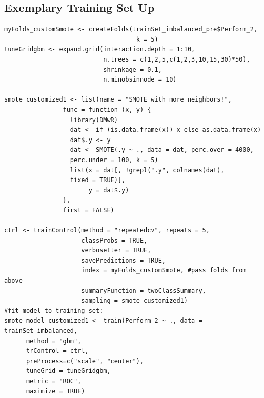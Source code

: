 \documentclass[12pt,a4paper]{article}
\begin{document}
\begin{appendices}
\section{Exemplary Training Set Up}\label{app:training_set_up}
\begin{verbatim}
myFolds_customSmote <- createFolds(trainSet_imbalanced_pre$Perform_2, 
                                    k = 5)
tuneGridgbm <- expand.grid(interaction.depth = 1:10, 
                           n.trees = c(1,2,5,c(1,2,3,10,15,30)*50),
                           shrinkage = 0.1,
                           n.minobsinnode = 10)

smote_customized1 <- list(name = "SMOTE with more neighbors!",
                func = function (x, y) {
                  library(DMwR)
                  dat <- if (is.data.frame(x)) x else as.data.frame(x)
                  dat$.y <- y
                  dat <- SMOTE(.y ~ ., data = dat, perc.over = 4000, 
                  perc.under = 100, k = 5)
                  list(x = dat[, !grepl(".y", colnames(dat), 
                  fixed = TRUE)], 
                       y = dat$.y)
                },
                first = FALSE) 

ctrl <- trainControl(method = "repeatedcv", repeats = 5,
                     classProbs = TRUE,
                     verboseIter = TRUE,
                     savePredictions = TRUE,
                     index = myFolds_customSmote, #pass folds from above 
                     summaryFunction = twoClassSummary,
                     sampling = smote_customized1) 
#fit model to training set:
smote_model_customized1 <- train(Perform_2 ~ ., data = trainSet_imbalanced, 
      method = "gbm",
      trControl = ctrl,
      preProcess=c("scale", "center"),
      tuneGrid = tuneGridgbm,
      metric = "ROC",
      maximize = TRUE)
\end{verbatim}

\end{appendices}
\end{document}
